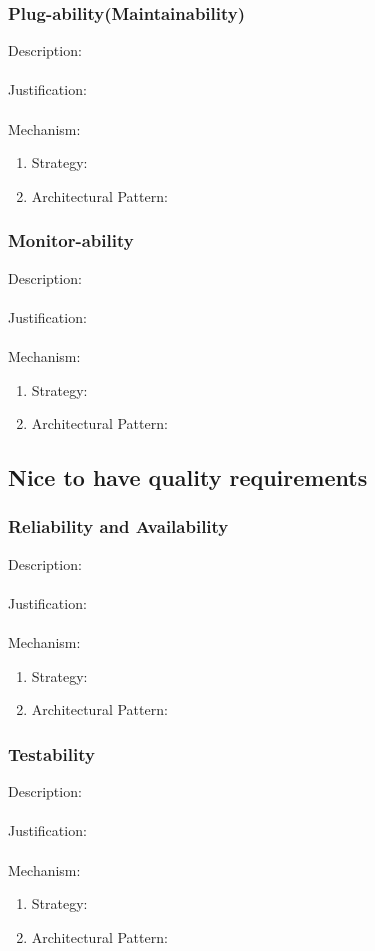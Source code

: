 \documentclass[a4paper,12pt,titlepage]{article}
\begin{document}
\subsubsection{Plug-ability(Maintainability)}%
	Description: \\\\
	Justification: \\\\
	Mechanism:
	\begin{enumerate}
		\item Strategy: 
		\item Architectural Pattern:
	\end{enumerate}
\subsubsection{Monitor-ability}%
	Description: \\\\
	Justification: \\\\
	Mechanism:
	\begin{enumerate}
		\item Strategy: 
		\item Architectural Pattern:
	\end{enumerate}
\newpage
\subsection{Nice to have quality requirements}
\subsubsection{Reliability and Availability}%
	Description: \\\\
	Justification: \\\\
	Mechanism:
	\begin{enumerate}
		\item Strategy: 
		\item Architectural Pattern:
	\end{enumerate}
\subsubsection{Testability}%
	Description: \\\\
	Justification: \\\\
	Mechanism:
	\begin{enumerate}
		\item Strategy: 
		\item Architectural Pattern:
	\end{enumerate}
\newpage
\end{document}
